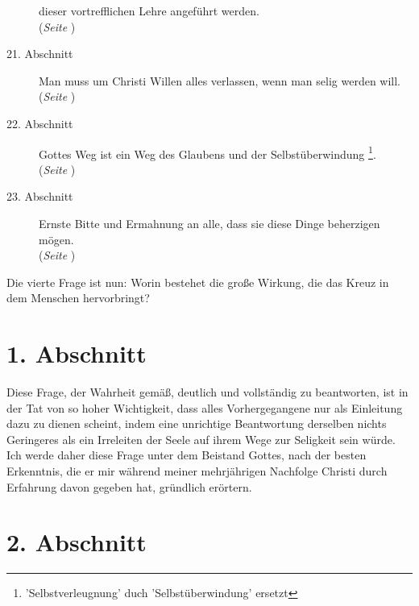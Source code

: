 \begin{description}
dieser vortrefflichen Lehre angeführt werden.
\\(\textit{Seite \pageref{kap4_ab20}})
\item[21. Abschnitt] Man muss um Christi Willen alles verlassen, wenn man selig
werden will.
\\(\textit{Seite \pageref{kap4_ab21}})
\item[22. Abschnitt] Gottes Weg ist ein Weg des Glaubens und der
Selbstüberwindung \footnote{'Selbstverleugnung' duch 'Selbstüberwindung'
ersetzt}.
\\(\textit{Seite \pageref{kap4_ab22}})
\item[23. Abschnitt] Ernste Bitte und Ermahnung an alle, dass sie diese Dinge
beherzigen mögen.
\\(\textit{Seite \pageref{kap4_ab23}})
\end{description}
\normalsize


Die vierte Frage ist nun: Worin bestehet die große Wirkung, die das Kreuz in dem
Menschen hervorbringt?

\section{1. Abschnitt} \label{kap4_ab1}

Diese Frage, der Wahrheit gemäß, deutlich und vollständig zu beantworten, ist in
der Tat von so hoher Wichtigkeit, dass alles Vorhergegangene nur als Einleitung
dazu zu dienen scheint, indem eine unrichtige Beantwortung derselben nichts
Geringeres als ein Irreleiten der Seele auf ihrem Wege zur Seligkeit sein würde.
Ich werde daher diese Frage unter dem Beistand Gottes, nach der besten
Erkenntnis, die er mir während meiner mehrjährigen Nachfolge Christi durch
Erfahrung davon gegeben hat, gründlich erörtern.

\section{2. Abschnitt} \label{kap4_ab2}


